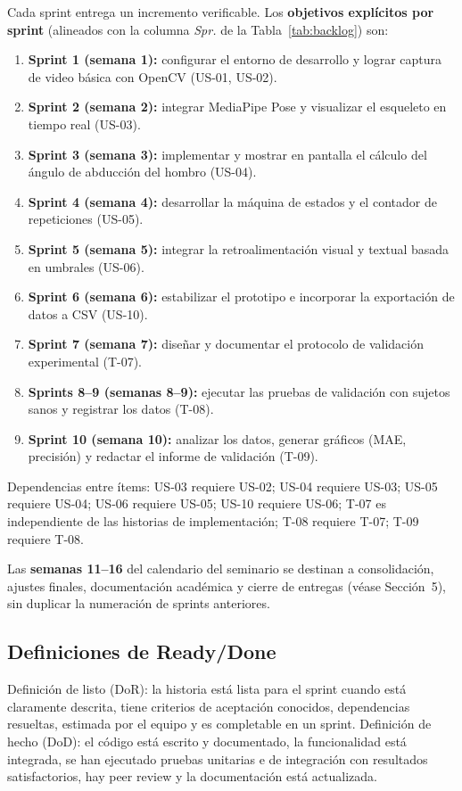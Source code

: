 \documentclass[11pt,a4paper]{article}
\begin{document}
Cada sprint entrega un incremento verificable. Los \textbf{objetivos explícitos por sprint} (alineados con la columna \textit{Spr.} de la Tabla~\ref{tab:backlog}) son:
\begin{enumerate}\setlength{\itemsep}{0.35em}
  \item \textbf{Sprint 1 (semana 1):} configurar el entorno de desarrollo y lograr captura de video básica con OpenCV (US-01, US-02).
  \item \textbf{Sprint 2 (semana 2):} integrar MediaPipe Pose y visualizar el esqueleto en tiempo real (US-03).
  \item \textbf{Sprint 3 (semana 3):} implementar y mostrar en pantalla el cálculo del ángulo de abducción del hombro (US-04).
  \item \textbf{Sprint 4 (semana 4):} desarrollar la máquina de estados y el contador de repeticiones (US-05).
  \item \textbf{Sprint 5 (semana 5):} integrar la retroalimentación visual y textual basada en umbrales (US-06).
  \item \textbf{Sprint 6 (semana 6):} estabilizar el prototipo e incorporar la exportación de datos a CSV (US-10).
  \item \textbf{Sprint 7 (semana 7):} diseñar y documentar el protocolo de validación experimental (T-07).
  \item \textbf{Sprints 8--9 (semanas 8--9):} ejecutar las pruebas de validación con sujetos sanos y registrar los datos (T-08).
  \item \textbf{Sprint 10 (semana 10):} analizar los datos, generar gráficos (MAE, precisión) y redactar el informe de validación (T-09).
\end{enumerate}

Dependencias entre ítems: US-03 requiere US-02; US-04 requiere US-03; US-05 requiere US-04; US-06 requiere US-05; US-10 requiere US-06; T-07 es independiente de las historias de implementación; T-08 requiere T-07; T-09 requiere T-08.

Las \textbf{semanas 11--16} del calendario del seminario se destinan a consolidación, ajustes finales, documentación académica y cierre de entregas (véase Sección~5), sin duplicar la numeración de sprints anteriores.

\subsection{Definiciones de Ready/Done}
Definición de listo (DoR): la historia está lista para el sprint cuando está claramente descrita, tiene criterios de aceptación conocidos, dependencias resueltas, estimada por el equipo y es completable en un sprint. Definición de hecho (DoD): el código está escrito y documentado, la funcionalidad está integrada, se han ejecutado pruebas unitarias e de integración con resultados satisfactorios, hay peer review y la documentación está actualizada.
\end{document}
